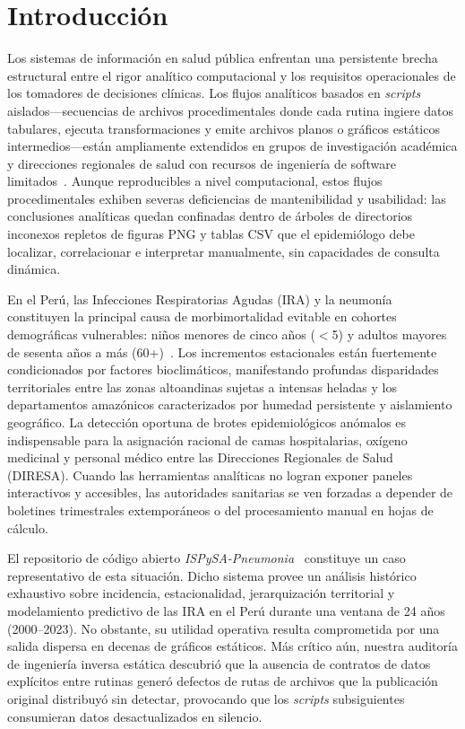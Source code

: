 \documentclass[conference]{IEEEtran}
\begin{document}
\section{Introducci\'on}
\label{sec:intro}

Los sistemas de informaci\'on en salud p\'ublica enfrentan una persistente brecha estructural entre el rigor anal\'itico computacional y los requisitos operacionales de los tomadores de decisiones cl\'inicas. Los flujos anal\'iticos basados en \textit{scripts} aislados---secuencias de archivos procedimentales donde cada rutina ingiere datos tabulares, ejecuta transformaciones y emite archivos planos o gr\'aficos est\'aticos intermedios---est\'an ampliamente extendidos en grupos de investigaci\'on acad\'emica y direcciones regionales de salud con recursos de ingenier\'ia de software limitados~\cite{Feathers2004}. Aunque reproducibles a nivel computacional, estos flujos procedimentales exhiben severas deficiencias de mantenibilidad y usabilidad: las conclusiones anal\'iticas quedan confinadas dentro de \'arboles de directorios inconexos repletos de figuras PNG y tablas CSV que el epidemi\'ologo debe localizar, correlacionar e interpretar manualmente, sin capacidades de consulta din\'amica.

En el Per\'u, las Infecciones Respiratorias Agudas (IRA) y la neumon\'ia constituyen la principal causa de morbimortalidad evitable en cohortes demogr\'aficas vulnerables: ni\~nos menores de cinco a\~nos ($<$5) y adultos mayores de sesenta a\~nos a m\'as (60+)~\cite{PAHO2011}. Los incrementos estacionales est\'an fuertemente condicionados por factores bioclim\'aticos, manifestando profundas disparidades territoriales entre las zonas altoandinas sujetas a intensas heladas y los departamentos amaz\'onicos caracterizados por humedad persistente y aislamiento geogr\'afico. La detecci\'on oportuna de brotes epidemiol\'ogicos an\'omalos es indispensable para la asignaci\'on racional de camas hospitalarias, ox\'igeno medicinal y personal m\'edico entre las Direcciones Regionales de Salud (DIRESA). Cuando las herramientas anal\'iticas no logran exponer paneles interactivos y accesibles, las autoridades sanitarias se ven forzadas a depender de boletines trimestrales extempor\'aneos o del procesamiento manual en hojas de c\'alculo.

El repositorio de c\'odigo abierto \textit{ISPySA-Pneumonia}~\cite{Danala2024} constituye un caso representativo de esta situaci\'on. Dicho sistema provee un an\'alisis hist\'orico exhaustivo sobre incidencia, estacionalidad, jerarquizaci\'on territorial y modelamiento predictivo de las IRA en el Per\'u durante una ventana de 24 a\~nos (2000--2023). No obstante, su utilidad operativa resulta comprometida por una salida dispersa en decenas de gr\'aficos est\'aticos. M\'as cr\'itico a\'un, nuestra auditor\'ia de ingenier\'ia inversa est\'atica descubri\'o que la ausencia de contratos de datos expl\'icitos entre rutinas gener\'o defectos de rutas de archivos que la publicaci\'on original distribuy\'o sin detectar, provocando que los \textit{scripts} subsiguientes consumieran datos desactualizados en silencio.
\end{document}
